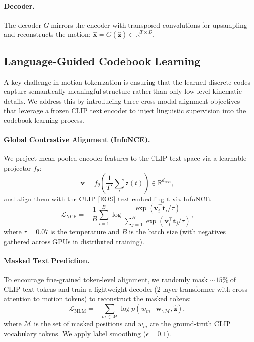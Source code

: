 \documentclass[10pt,twocolumn]{article}
\begin{document}
\paragraph{Decoder.} The decoder $G$ mirrors the encoder with transposed convolutions for upsampling and reconstructs the motion: $\hat{\mathbf{x}} = G(\hat{\mathbf{z}}) \in \mathbb{R}^{T \times D}$.

\subsection{Language-Guided Codebook Learning}

A key challenge in motion tokenization is ensuring that the learned discrete codes capture semantically meaningful structure rather than only low-level kinematic details. We address this by introducing three cross-modal alignment objectives that leverage a frozen CLIP text encoder to inject linguistic supervision into the codebook learning process.

\paragraph{Global Contrastive Alignment (InfoNCE).}
We project mean-pooled encoder features to the CLIP text space via a learnable projector $f_\theta$:
\begin{equation}
    \mathbf{v} = f_\theta\!\left(\frac{1}{T'}\sum_{t} \mathbf{z}(t)\right) \in \mathbb{R}^{d_\text{text}},
\end{equation}
and align them with the CLIP [EOS] text embedding $\mathbf{t}$ via InfoNCE:
\begin{equation}
    \mathcal{L}_{\text{NCE}} = -\frac{1}{B}\sum_{i=1}^{B} \log \frac{\exp(\mathbf{v}_i^\top \mathbf{t}_i / \tau)}{\sum_{j=1}^{B} \exp(\mathbf{v}_i^\top \mathbf{t}_j / \tau)},
\end{equation}
where $\tau{=}0.07$ is the temperature and $B$ is the batch size (with negatives gathered across GPUs in distributed training).

\paragraph{Masked Text Prediction.}
To encourage fine-grained token-level alignment, we randomly mask ${\sim}15\%$ of CLIP text tokens and train a lightweight decoder (2-layer transformer with cross-attention to motion tokens) to reconstruct the masked tokens:
\begin{equation}
    \mathcal{L}_{\text{MLM}} = -\sum_{m \in \mathcal{M}} \log p(w_m \mid \mathbf{w}_{\backslash \mathcal{M}}, \hat{\mathbf{z}}),
\end{equation}
where $\mathcal{M}$ is the set of masked positions and $w_m$ are the ground-truth CLIP vocabulary tokens. We apply label smoothing ($\epsilon{=}0.1$).
\end{document}
